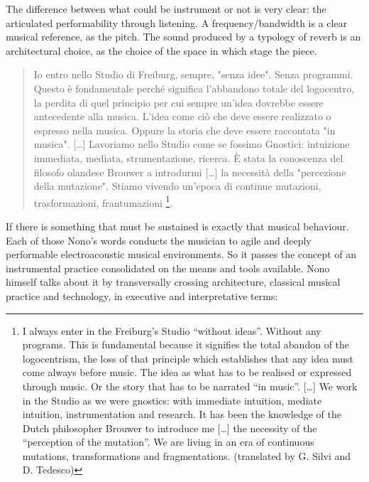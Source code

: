 \documentclass[twoside,a4paper]{article}
\begin{document}
The difference between what could be instrument or not is very clear: the
articulated performability through listening. A frequency/bandwidth is a clear
musical reference, as the pitch. The sound produced by a typology of reverb is
an architectural choice, as the choice of the space in which stage the piece.

\begin{quote}
Io entro nello Studio di Freiburg, sempre, "senza idee". Senza programmi. Questo
è fondamentale perché significa l'abbandono totale del logocentro, la perdita di
quel principio per cui sempre un'idea dovrebbe essere antecedente alla musica.
L'idea come ciò che deve essere realizzato o espresso nella musica. Oppure la
storia che deve essere raccontata "in musica". [\ldots] %
Lavoriamo nello Studio come se fossimo Gnostici: intuizione immediata, mediata,
strumentazione, ricerca. È stata la conoscenza del filosofo olandese Brouwer a
introdurmi [\ldots] la necessità della "percezione della mutazione". Stiamo
vivendo un'epoca di continue mutazioni, trasformazioni, frantumazioni
\cite{nono85}\footnote{I always enter in the Freiburg's Studio “without ideas”.
Without any programs. This is fundamental because it signifies the total abandon
of the logocentrism, the loss of that principle which establishes that any idea
must come always before music. The idea as what has to be realised or expressed
through music. Or the story that has to be narrated “in music”. [\dots] We work
in the Studio as we were gnostics: with immediate intuition, mediate intuition,
instrumentation and research. It has been the knowledge of the Dutch philosopher
Brouwer to introduce me [\dots] the necessity of the “perception of the mutation”.
We are living in an era of continuous mutations, transformations and fragmentations.
(translated by G. Silvi and D. Tedesco)}.
\end{quote}

If there is something that must be sustained is exactly that musical behaviour.
Each of those Nono's words conducts the musician to agile and deeply performable
electroacoustic musical environments. So it passes the concept of an instrumental
practice consolidated on the means and tools available. Nono himself talks about
it by transversally crossing architecture, classical musical practice and
technology, in executive and interpretative terms:
\end{document}
